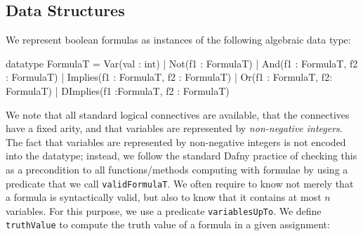 \documentclass[12pt]{report}
\begin{document}
\subsection{Data Structures}

We represent boolean formulas as instances of the following algebraic
data type:

\begin{dafny}
datatype FormulaT = Var(val : int)  | Not(f1 : FormulaT)
| And(f1 : FormulaT, f2 : FormulaT) | Implies(f1 : FormulaT, f2 : FormulaT)
| Or(f1 : FormulaT, f2: FormulaT)   | DImplies(f1 :FormulaT, f2 : FormulaT)

\end{dafny}

We note that all standard logical connectives are available, that the
connectives have a fixed arity, and that variables are represented by
\emph{non-negative integers}. The fact that variables are represented
by non-negative integers is not encoded into the datatype; instead, we
follow the standard Dafny practice of checking this as a precondition
to all functions/methods computing with formulae by using a
predicate that we call \texttt{validFormulaT}.
%
%
%
We often require to know not merely that a formula is syntactically
valid, but also to know that it contains at most \( n \)
variables. For this purpose, we use a predicate
\texttt{variablesUpTo}.%
%
%
We define \texttt{truthValue} to compute the truth value of a formula in
a given assignment:
\end{document}
